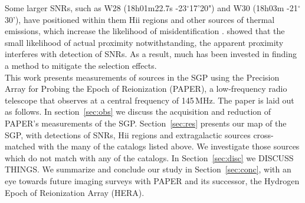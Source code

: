 \documentclass[useAMS,usenatbib]{mn2e}
\begin{document}
Some larger SNRs, such as W28 (18h01m22.7s -23$^{\circ}$17'20") and W30 (18h03m -21$^{\circ}$30'), have positioned within them H{\sc ii} regions and other sources of thermal emissions, which increase the likelihood of misidentification \citep{Andrews.85}. \cite{Brogan.06} showed that the small likelihood of actual proximity notwithstanding, the apparent proximity interferes with detection of SNRs.  As a result, much has been invested in finding a method to mitigate the selection effects.\\




This work presents measurements of sources in the SGP using the Precision Array for Probing the Epoch of Reionization (PAPER), a low-frequency radio telescope that observes at a central frequency of 145\,MHz. The paper is laid out as follows. In section~\ref{sec:obs} we discuss the acquisition and reduction of PAPER's measurements of the SGP. Section~\ref{sec:res} presents our map of the SGP, with detections of SNRs, H{\sc ii} regions and extragalactic sources cross-matched with the many of the catalogs listed above. We investigate those sources which do not match with any of the catalogs. In Section~\ref{sec:disc} we {\color{red} DISCUSS THINGS}. We summarize and conclude our study in Section~\ref{sec:conc}, with an eye towards future imaging surveys with PAPER and its successor, the Hydrogen Epoch of Reionization Array (HERA).
\end{document}
